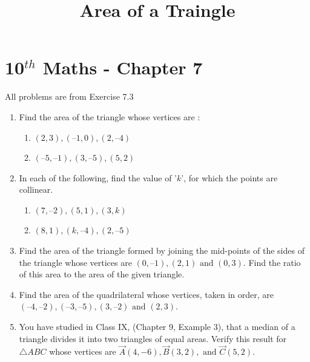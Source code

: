 \documentclass[12pt]{article}
\begin{document}
\begin{center}
\title{\textbf{Area of a Traingle}}
\date{\vspace{-5ex}} %
\maketitle
\end{center}

\setcounter{page}{1}



\section{10$^{th}$ Maths - Chapter 7}

All problems are from Exercise 7.3

\begin{enumerate}
\item Find the area of the triangle whose vertices are :
\begin{enumerate}
\item $(2, 3), (–1, 0), (2, – 4)$
\item $(–5, –1), (3, –5), (5, 2)$ 
\end{enumerate}

\item In each of the following, find the value of '$k$', for which the points are collinear.
\begin{enumerate}
\item $(7, –2), (5, 1), (3, k)$
\item $(8, 1), (k, – 4), (2, –5)$
\end{enumerate}

\item Find the area of the triangle formed by joining the mid-points of the sides of the triangle whose vertices are $(0, –1), (2, 1) \text{ and } (0, 3)$. Find the ratio of this area to the area of the given triangle.

\item Find the area of the quadrilateral whose vertices, taken in order, are $(– 4, – 2), (– 3, – 5), (3, – 2) \text{ and } (2, 3)$.

\item You have studied in Class IX, (Chapter 9, Example 3), that a median of a triangle divides it into two triangles of equal areas. Verify this result for $\triangle ABC$ whose vertices are $\vec{A}(4, -6), \vec{B}(3, 2), \text{ and } \vec{C}(5, 2)$. 

\end{enumerate}
\end{document}
